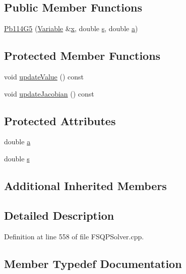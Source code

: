 \subsection*{Public Member Functions}
\begin{DoxyCompactItemize}
\item 
\hyperlink{classocra_1_1Pb114G5_a53ef7eb76deed9c8ca148f175f9bb8a6}{Pb114\+G5} (\hyperlink{classocra_1_1Variable}{Variable} \&\hyperlink{classocra_1_1Function_a28825886d1f149c87b112ec2ec1dd486}{x}, double \hyperlink{classocra_1_1Pb114G5_a97daa687d5cec8995656fa8787f8a89e}{s}, double \hyperlink{classocra_1_1Pb114G5_a36c7950fd1d7556715ae7e0749e88211}{a})
\end{DoxyCompactItemize}
\subsection*{Protected Member Functions}
\begin{DoxyCompactItemize}
\item 
void \hyperlink{classocra_1_1Pb114G5_a2a19291b7ef222254a018c0e25df8f57}{update\+Value} () const
\item 
void \hyperlink{classocra_1_1Pb114G5_a8dc90051ef52688c0879a3d129d5bf84}{update\+Jacobian} () const
\end{DoxyCompactItemize}
\subsection*{Protected Attributes}
\begin{DoxyCompactItemize}
\item 
double \hyperlink{classocra_1_1Pb114G5_a36c7950fd1d7556715ae7e0749e88211}{a}
\item 
double \hyperlink{classocra_1_1Pb114G5_a97daa687d5cec8995656fa8787f8a89e}{s}
\end{DoxyCompactItemize}
\subsection*{Additional Inherited Members}


\subsection{Detailed Description}


Definition at line 558 of file F\+S\+Q\+P\+Solver.\+cpp.



\subsection{Member Typedef Documentation}
\hypertarget{classocra_1_1Pb114G5_af9b5d124dfe6eefc49fe0603b948330e}{}\label{classocra_1_1Pb114G5_af9b5d124dfe6eefc49fe0603b948330e} 
